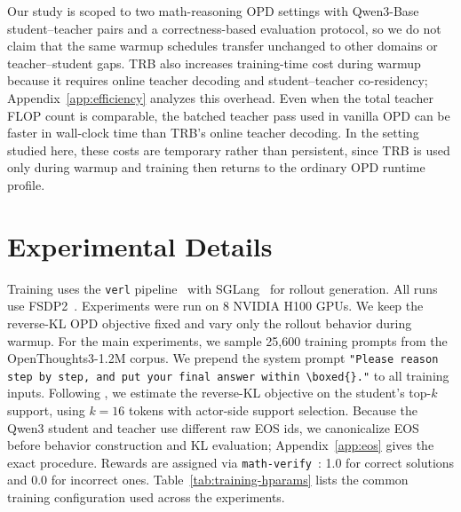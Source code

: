 \documentclass[11pt]{article}
\begin{document}
Our study is scoped to two math-reasoning OPD settings with Qwen3-Base student--teacher pairs and a correctness-based evaluation protocol, so we do not claim that the same warmup schedules transfer unchanged to other domains or teacher--student gaps. TRB also increases training-time cost during warmup because it requires online teacher decoding and student--teacher co-residency; Appendix~\ref{app:efficiency} analyzes this overhead. Even when the total teacher FLOP count is comparable, the batched teacher pass used in vanilla OPD can be faster in wall-clock time than TRB's online teacher decoding. In the setting studied here, these costs are temporary rather than persistent, since TRB is used only during warmup and training then returns to the ordinary OPD runtime profile.


\clearpage

\appendix
\onecolumn

\section{Experimental Details}
\label{app:exp_details}

Training uses the \texttt{verl} pipeline~\citep{verl} with SGLang~\citep{sglang} for rollout generation. All runs use FSDP2~\citep{fsdp}.
Experiments were run on 8 NVIDIA H100 GPUs.
We keep the reverse-KL OPD objective fixed and vary only the rollout behavior during warmup.
For the main experiments, we sample 25{,}600 training prompts from the OpenThoughts3-1.2M corpus.
We prepend the system prompt \texttt{"Please reason step by step, and put your final answer within \textbackslash boxed\{\}."} to all training inputs.
Following \citet{li2026rethinking}, we estimate the reverse-KL objective on the student's top-$k$ support, using $k=16$ tokens with actor-side support selection. Because the Qwen3 student and teacher use different raw EOS ids, we canonicalize EOS before behavior construction and KL evaluation; Appendix~\ref{app:eos} gives the exact procedure.
Rewards are assigned via \texttt{math-verify}~\citep{mathverify}: 1.0 for correct solutions and 0.0 for incorrect ones.
Table~\ref{tab:training-hparams} lists the common training configuration used across the experiments.
\end{document}
